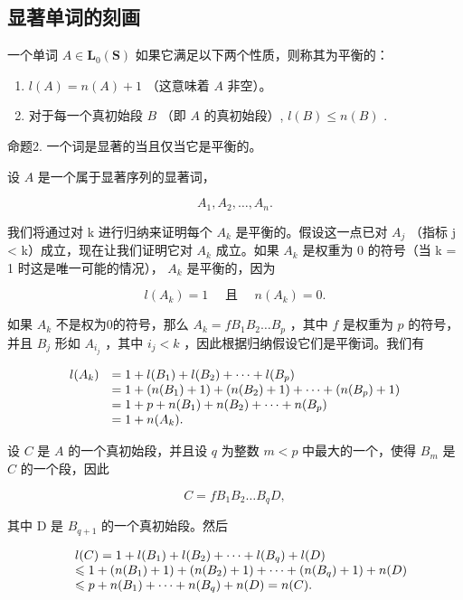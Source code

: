 \subsection{显著单词的刻画}

一个单词 \(A \in \mathbf{L}_0(\mathbf{S})\) 如果它满足以下两个性质，则称其为平衡的：

\begin{enumerate}
\def\labelenumi{(\arabic{enumi})}
\item
  \(l(A) = n(A) + 1\) （这意味着 \(A\) 非空）。
\item
  对于每一个真初始段 \(B\) （即 \(A\) 的真初始段）, \(l(B) \leqslant n(B)\) .
\end{enumerate}

命题2. 一个词是显著的当且仅当它是平衡的。

设 \(A\) 是一个属于显著序列的显著词，

\[
A _ {1}, A _ {2}, \dots , A _ {n}.
\]

我们将通过对 k 进行归纳来证明每个 \(A_{k}\) 是平衡的。假设这一点已对 \(A_{j}\) （指标 j \textless{} k）成立，现在让我们证明它对 \(A_{k}\) 成立。如果 \(A_{k}\) 是权重为 0 的符号（当 k = 1 时这是唯一可能的情况）， \(A_{k}\) 是平衡的，因为

\[
l (A _ {k}) = 1 \quad \text { 且 } \quad n (A _ {k}) = 0.
\]

如果 \(A_{k}\) 不是权为0的符号，那么 \(A_{k} = fB_{1}B_{2}\ldots B_{p}\) ，其中 \(f\) 是权重为 \(p\) 的符号，并且 \(B_{j}\) 形如 \(A_{i_{j}}\) ，其中 \(i_{j} < k\) ，因此根据归纳假设它们是平衡词。我们有

\[
\begin{array}{r l} l (A _ {k}) & = 1 + l (B _ {1}) + l (B _ {2}) + \dots + l (B _ {p}) \\ & = 1 + (n (B _ {1}) + 1) + (n (B _ {2}) + 1) + \dots + (n (B _ {p}) + 1) \\ & = 1 + p + n (B _ {1}) + n (B _ {2}) + \dots + n (B _ {p}) \\ & = 1 + n (A _ {k}). \end{array}
\]

设 \(C\) 是 \(A\) 的一个真初始段，并且设 \(q\) 为整数 \(m < p\) 中最大的一个，使得 \(B_{m}\) 是 \(C\) 的一个段，因此

\[
C = f B _ {1} B _ {2} \dots B _ {q} D,
\]

其中 D 是 \(B_{q+1}\) 的一个真初始段。然后

\[
\begin{array}{r l} & l (C) = 1 + l (B _ {1}) + l (B _ {2}) + \dots + l (B _ {q}) + l (D) \\ & \leqslant 1 + (n (B _ {1}) + 1) + (n (B _ {2}) + 1) + \dots + (n (B _ {q}) + 1) + n (D) \\ & \leqslant p + n (B _ {1}) + \dots + n (B _ {q}) + n (D) = n (C). \end{array}
\]

